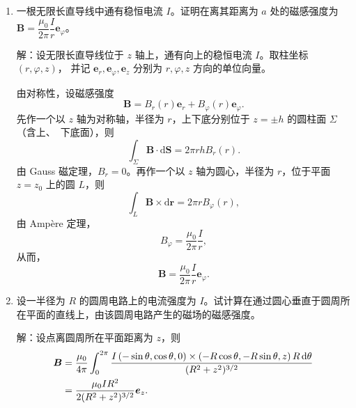 \begin{enumerate}
\begin{tikzpicture}
\end{tikzpicture}
又设 $A, B, C$ 三点的电压分别为 $U_{A}, U_{B}, U_{C}$，电源中从 $P$ 到 $Q$ 的电流为 $I$。由 Kirchhoff 电流定律，
\begin{align*}
\frac{\mathcal{E}-U_{A}}{10\Omega}+\frac{\mathcal{E}-U_{B}}{10\Omega}+\frac{\mathcal{E}-U_{C}}{40\Omega}&=I, \\
\frac{U_{A}}{5\Omega}+\frac{U_{A}-\mathcal{E}}{10\Omega}+\frac{U_{A}-U_{C}}{10\Omega}&=0, \\
\frac{U_{B}}{10\Omega}+\frac{U_{B}-\mathcal{E}}{10\Omega}+\frac{U_{B}-U_{C}}{5\Omega}&=0, \\
\frac{U_{A}}{5\Omega}+\frac{U_{B}}{10\Omega}&=I.
\end{align*}
由此解得
$$U_{A}=\frac{3}{8} \mathcal{E}, \quad U_{B}=U_{C}=\frac{1}{2} \mathcal{E}, \quad \frac{\mathcal{E}}{I}=8 \Omega.$$
所以 $P, Q$ 间的电阻为 $8 \Omega$。

\item 一根无限长直导线中通有稳恒电流 $I$。证明在离其距离为 $a$ 处的磁感强度为 $\boldsymbol{B}=\dfrac{\mu_0}{2\pi}\dfrac{I}{r}\boldsymbol{e}_{\varphi}$。

解：设无限长直导线位于 $z$ 轴上，通有向上的稳恒电流 $I$。取柱坐标 $(r, \varphi, z)$，
并记 $\boldsymbol{e}_{r}, \boldsymbol{e}_{\varphi}, \boldsymbol{e}_{z}$ 分别为 $r, \varphi, z$ 方向的单位向量。

由对称性，设磁感强度
$$\boldsymbol{B}=B_{r}(r) \boldsymbol{e}_{r}+B_{\varphi}(r) \boldsymbol{e}_{\varphi}.$$
先作一个以 $z$ 轴为对称轴，半径为 $r$，上下底分别位于 $z= \pm h$ 的圆柱面 $\Sigma$（含上、\ 下底面），则
$$\int_{\Sigma} \boldsymbol{B} \cdot \mathrm{d} \boldsymbol{S}=2 \pi r h B_{r}(r).$$
由 Gauss 磁定理，$B_{r}=0$。再作一个以 $z$ 轴为圆心，半径为 $r$，位于平面 $z=z_{0}$ 上的圆 $L$，则
$$\int_{L} \boldsymbol{B} \times \mathrm{d} \boldsymbol{r}=2 \pi r B_{\varphi}(r),$$
由 Ampère 定理，
$$B_{\varphi}=\frac{\mu_{0}}{2\pi} \frac{I}{r},$$
从而，
$$\boldsymbol{B}=\frac{\mu_{0}}{2\pi} \frac{I}{r} \boldsymbol{e}_{\varphi}.$$

\item 设一半径为 $R$ 的圆周电路上的电流强度为 $I$。试计算在通过圆心垂直于圆周所在平面的直线上，由该圆周电路产生的磁场的磁感强度。

解：设点离圆周所在平面距离为 $z$，则
\begin{align*}
\boldsymbol{B} & =\frac{\mu_{0}}{4\pi} \int_{0}^{2\pi} \frac{I\,(-\sin \theta, \cos \theta, 0) \times(-R \cos \theta,-R \sin \theta,z) \, R \,{\rm d} \theta}{(R^{2}+z^{2})^{3/2}} \\
& =\frac{\mu_{0}IR^{2}}{2(R^{2}+z^{2})^{3/2}} \boldsymbol{e}_{z}.
\end{align*}


\end{enumerate}

